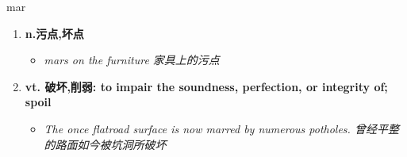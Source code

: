 
\begin{frame}
{\huge mar}
\begin{center}
\begin{enumerate}\Large
  \item \textbf{n.污点,坏点}
  \begin{itemize}
    \item \em{\Large{mars on the furniture 家具上的污点}}
  \end{itemize}
  \item \textbf{vt. 破坏,削弱: to impair the soundness, perfection, or integrity of; spoil}
  \begin{itemize}
    \item \em{\Large{The once flatroad surface is now marred by numerous potholes. 曾经平整的路面如今被坑洞所破坏}}
  \end{itemize}
\end{enumerate}
\end{center}
\end{frame}
